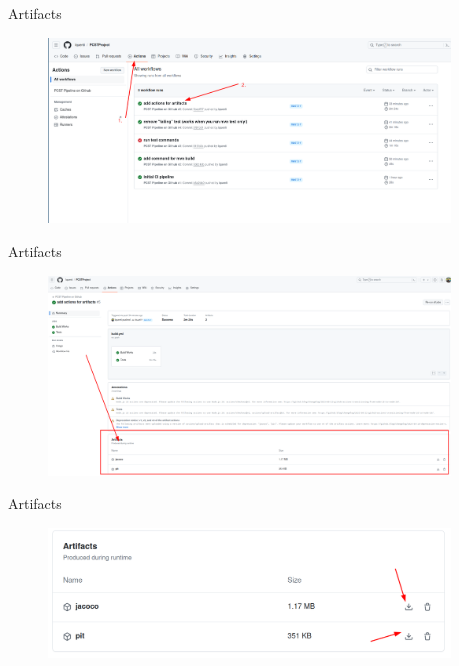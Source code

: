 \documentclass[compress,aspectratio=169]{beamer}
\begin{document}
	\begin{frame}{Artifacts}
    \begin{figure}
      \begin{center}
        \includegraphics[width=0.95\textwidth]{artifacts1.png}
      \end{center}
    \end{figure}
	\end{frame}
	\begin{frame}{Artifacts}
    \begin{figure}
      \begin{center}
        \includegraphics[width=0.95\textwidth]{artifacts2.png}
      \end{center}
    \end{figure}
	\end{frame}
	\begin{frame}{Artifacts}
    \begin{figure}
      \begin{center}
        \includegraphics[width=0.95\textwidth]{artifacts3.png}
      \end{center}
    \end{figure}
	\end{frame}
\end{document}
